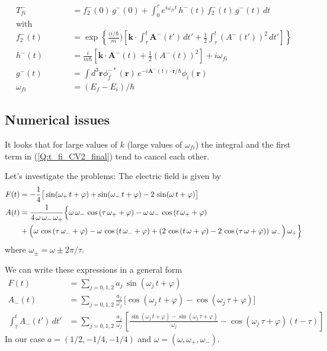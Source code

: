 \begin{subequations}
  \begin{align} \label{Q:t_fi_CV2_final}
    T_{fi}^{-}&= f_{2}^{-}(0)\, g^{-}(0) + \int_{0}^{\tau} e^{i\omega_{fi}t} \, h^{-}(t)\, f_{2}^{-}(t)\, g^{-}(t)\, dt \\
    \mathrm{with} \qquad \qquad & \nonumber \\
    f_{2}^{-}(t) &= \exp{\left\{\frac{(i/\hbar}{m}) \left[ \bm{k} \cdot \int_{\tau}^{t} \bm{A}^{-}(t')\, dt' + \frac{1}{2}\int_{\tau}^{t} \left( A^{-}(t') \right)^{2}\, dt' \right]
      \right\} } \\
h^{-}(t) &= \frac{i}{m \hbar} \left[ \bm{k} \cdot \bm{A}^{-}(t) + \frac{1}{2} \left( A^{-}(t) \right)^{2} \right] + i \omega_{fi} \\
g^{-}(t) &= \int d^{3}\bm{r} \phi^{-*}_{f}(\bm{r}) \, e^{-i \bm{A}^{-}(t) \cdot \bm{r}/\hbar} \phi_{i}(\bm{r})\\
\omega_{fi}&=   (E_{f}-E_{i})/\hbar \nonumber
  \end{align}
\end{subequations}

\subsection{Numerical issues}
\label{S:numerical-issues}

It looks that for large values of $k$ (large values of $\omega_{fi}$) the integral and the first term in (\ref{Q:t_fi_CV2_final}) tend to cancel each other.

Let's investigate the problems:
The electric field is given by
\begin{align}
F(t)&= -\frac{1}{4} \big[\sin( \omega_{+}\,t + \varphi) + \sin( \omega_{-}\,t + \varphi) - 2 \,\sin( \omega \,t + \varphi ) \big]\\
A(t)&=
\frac{1}{4\,\omega\,\omega_{-}\,\omega_{+}}\Big\{\omega\,\omega_{-}\,\cos\left( \tau\,\omega_{+}+\varphi\right) -\omega\,\omega_{-}\,\cos\left( t\,\omega_{+}+\varphi\right) \notag \\
&+\Big( \omega\,\cos\left( \tau\,\omega_{-}+\varphi\right) -\omega\,\cos\left( t\,\omega_{-}+\varphi\right) + 
\left( 2\,\cos\left( t\,\omega+\varphi\right) -2\,\cos\left( \tau\,\omega+\varphi\right) \right) \,\omega_{-}\Big) \,\omega_{+}\Big\}
\end{align}
where $\omega_{\pm}= \omega \pm 2 \pi/\tau$.

We can write these expressions in a general form
\begin{align}
F(t) &= \sum_{j=0,1,2} a_{j}\, \sin(\omega_{j}\,t + \varphi)\\
A_{-}(t) &= \sum_{j=0,1,2} \frac{a_{j}}{\omega_{j}}\, \big[\cos(\omega_{j}\,t + \varphi) - \cos(\omega_{j}\,\tau + \varphi)\big]\\
\int_{\tau}^{t} A_{-}(t')\, dt' &= \sum_{j=0,1,2} \frac{a_{j}}{\omega_{j}}\, \left[\frac{\sin(\omega_{j}\,t + \varphi) - \sin(\omega_{j}\,\tau + \varphi)}{\omega_{j}} - \cos(\omega_{j}\,\tau + \varphi)(t-\tau)\right]
\end{align}
In our case $a=(1/2,-1/4,-1/4)$ and $\omega=(\omega, \omega_{+}, \omega_{-})$.

